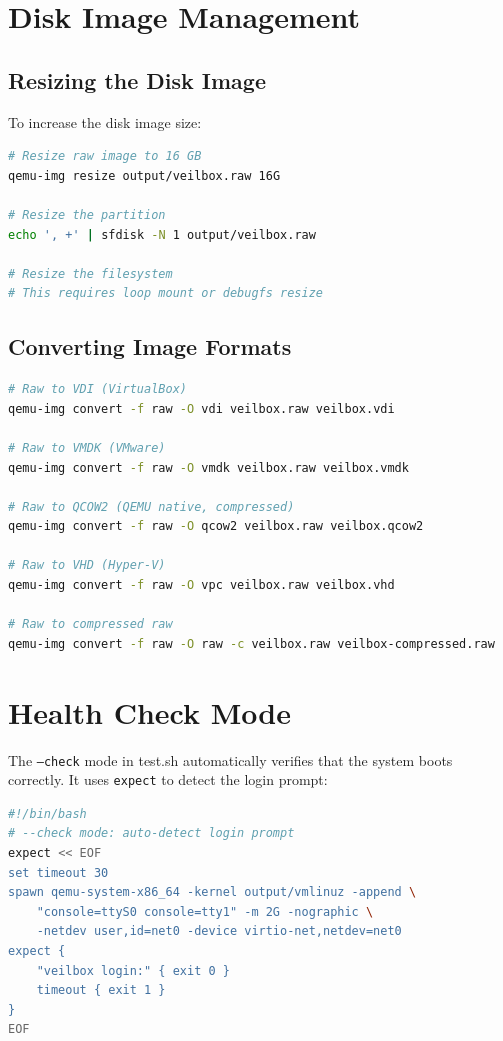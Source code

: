 \section{Disk Image Management}

\subsection{Resizing the Disk Image}

To increase the disk image size:

\begin{lstlisting}[language=bash]
# Resize raw image to 16 GB
qemu-img resize output/veilbox.raw 16G

# Resize the partition
echo ', +' | sfdisk -N 1 output/veilbox.raw

# Resize the filesystem
# This requires loop mount or debugfs resize
\end{lstlisting}

\subsection{Converting Image Formats}

\begin{lstlisting}[language=bash]
# Raw to VDI (VirtualBox)
qemu-img convert -f raw -O vdi veilbox.raw veilbox.vdi

# Raw to VMDK (VMware)
qemu-img convert -f raw -O vmdk veilbox.raw veilbox.vmdk

# Raw to QCOW2 (QEMU native, compressed)
qemu-img convert -f raw -O qcow2 veilbox.raw veilbox.qcow2

# Raw to VHD (Hyper-V)
qemu-img convert -f raw -O vpc veilbox.raw veilbox.vhd

# Raw to compressed raw
qemu-img convert -f raw -O raw -c veilbox.raw veilbox-compressed.raw
\end{lstlisting}

\section{Health Check Mode}

The \texttt{--check} mode in test.sh automatically verifies that the
system boots correctly. It uses \texttt{expect} to detect the login
prompt:

\begin{lstlisting}[language=bash]
#!/bin/bash
# --check mode: auto-detect login prompt
expect << EOF
set timeout 30
spawn qemu-system-x86_64 -kernel output/vmlinuz -append \
    "console=ttyS0 console=tty1" -m 2G -nographic \
    -netdev user,id=net0 -device virtio-net,netdev=net0
expect {
    "veilbox login:" { exit 0 }
    timeout { exit 1 }
}
EOF
\end{lstlisting}
